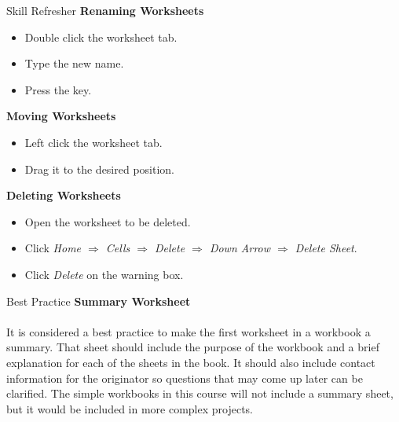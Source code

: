 \begin{center}
	\begin{sklbox}{Skill Refresher}
		\textbf{Renaming Worksheets}
		\\
		\begin{itemize}
			\setlength{\itemsep}{0pt}
			\setlength{\parskip}{0pt}
			\setlength{\parsep}{0pt}
			
			\item Double click the worksheet tab.
			\item Type the new name.
			\item Press the  key.
		\end{itemize}

		\hfill \break
		\textbf{Moving Worksheets}
		\\
		\begin{itemize}
			\setlength{\itemsep}{0pt}
			\setlength{\parskip}{0pt}
			\setlength{\parsep}{0pt}
			
			\item Left click the worksheet tab.
			\item Drag it to the desired position.
		\end{itemize}

		\hfill \break
		\textbf{Deleting Worksheets}
		\\
		\begin{itemize}
			\setlength{\itemsep}{0pt}
			\setlength{\parskip}{0pt}
			\setlength{\parsep}{0pt}
			
			\item Open the worksheet to be deleted.
			\item Click \textit{Home $ \Rightarrow $ Cells $ \Rightarrow $ Delete $ \Rightarrow $ Down Arrow $ \Rightarrow $ Delete Sheet}.
			\item Click \textit{Delete} on the warning box.
		\end{itemize}

	\end{sklbox}
\end{center}

\begin{center}
	\begin{infobox}{Best Practice}
		\textbf{Summary Worksheet}
		\\
		\\
		It is considered a best practice to make the first worksheet in a workbook a summary. That sheet should include the purpose of the workbook and a brief explanation for each of the sheets in the book. It should also include contact information for the originator so questions that may come up later can be clarified. The simple workbooks in this course will not include a summary sheet, but it would be included in more complex projects.
	\end{infobox}
\end{center}


